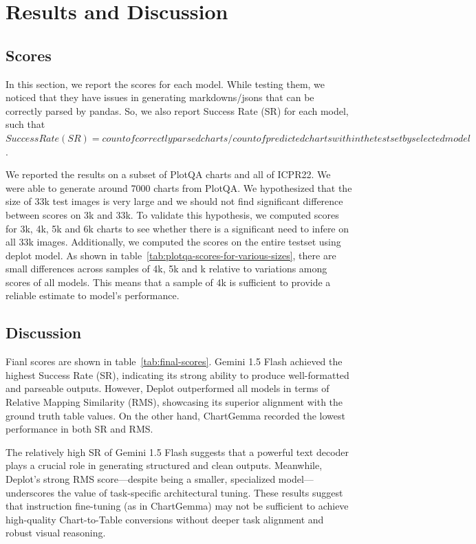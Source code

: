 \documentclass[
	letterpaper, %
]{jdf}
\begin{document}
\section{Results and Discussion}\label{sect:results}
\subsection{Scores}\label{ssect:rms}
In this section, we report the scores for each model.
While testing them, we noticed that they have issues in generating markdowns/jsons that can be correctly parsed by pandas.
So, we also report Success Rate (SR) for each model, such that $Success Rate (SR) = count of correctly parsed charts/count of predicted charts within the testset by selected model$.

We reported the results on a subset of PlotQA charts and all of ICPR22.
We were able to generate around 7000 charts from PlotQA.
We hypothesized that the size of 33k test images is very large and we should not find significant difference between scores on 3k and 33k.
To validate this hypothesis, we computed scores for 3k, 4k, 5k and 6k charts to see whether there is a significant need to infere on all 33k images.
Additionally, we computed the scores on the entire testset using deplot model.
As shown in table~\ref{tab:plotqa-scores-for-various-sizes}, there are small differences across samples of 4k, 5k and k relative to variations among scores of all models.
This means that a sample of 4k is sufficient to provide a reliable estimate to model's performance.


\subsection{Discussion}\label{ssect:discussion}

Fianl scores are shown in table~\ref{tab:final-scores}.
Gemini 1.5 Flash achieved the highest Success Rate (SR), indicating its strong ability to produce well-formatted and parseable outputs.
However, Deplot outperformed all models in terms of Relative Mapping Similarity (RMS), showcasing its superior alignment with the ground truth table values.
On the other hand, ChartGemma recorded the lowest performance in both SR and RMS.

The relatively high SR of Gemini 1.5 Flash suggests that a powerful text decoder plays a crucial role in generating structured and clean outputs.
Meanwhile, Deplot’s strong RMS score—despite being a smaller, specialized model—underscores the value of task-specific architectural tuning.
These results suggest that instruction fine-tuning (as in ChartGemma) may not be sufficient to achieve high-quality Chart-to-Table conversions without deeper task alignment and robust visual reasoning.
\end{document}
